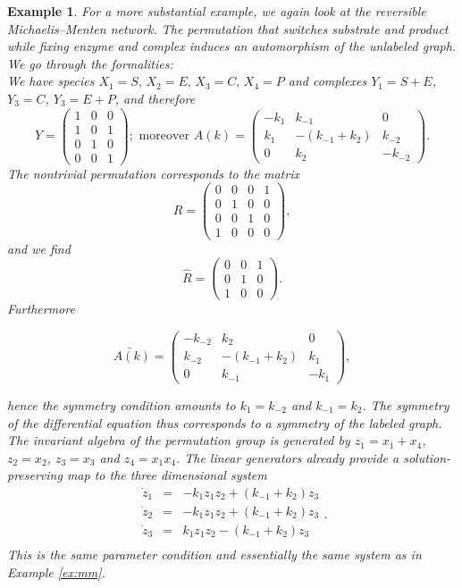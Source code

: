 \documentclass{article}
\newtheorem{example}{Example}
\begin{document}
\begin{example}{\em 
For a more substantial example, we again look at the reversible Michaelis--Menten network. The permutation that switches substrate and product while fixing enzyme and complex induces an automorphism of the unlabeled  graph. We go through the formalities:\\
We have species $X_1=S,\,X_2=E,\,X_3=C,\,X_4=P$ and complexes $Y_1=S+E$, $Y_3=C$, $Y_3=E+P$, and therefore
\[
Y=\begin{pmatrix} 1&0&0\\ 1&0&1\\0&1&0\\ 0&0&1\end{pmatrix};\text{  moreover  } A(k)=\begin{pmatrix} -k_1 &k_{-1}&0\\
k_1&-(k_{-1}+k_2) & k_{-2}\\ 0& k_{2}&-k_{-2}\end{pmatrix}.
\]
The nontrivial permutation corresponds to the matrix
\[
R=\begin{pmatrix} 0&0&0&1\\ 0&1&0&0\\ 0&0&1&0\\ 1&0&0&0\end{pmatrix},
\]
and we find 
\[
\widehat R=\begin{pmatrix} 0&0&1\\ 0&1&0\\1&0&0\end{pmatrix}.
\]
Furthermore

\[
\widetilde{A(k)}=\begin{pmatrix} -k_{-2} &k_{2}&0\\
k_{-2}&-(k_{-1}+k_2) & k_1\\ 0& k_{-1}&-k_{1}\end{pmatrix},
\]

hence the symmetry condition amounts to $k_1=k_{-2}$ and $k_{-1}=k_2$. The symmetry of the differential equation thus corresponds to a symmetry of the labeled graph.\\
The invariant algebra of the permutation group is generated by $z_1=x_1+x_4$, $z_2=x_2$, $z_3=x_3$ and $z_4=x_1x_4$. The linear generators already provide a solution-preserving map to the three dimensional system
\[
\begin{array}{rcl}
   \dot z_1  &=& -k_1z_1z_2+(k_{-1}+k_2)z_3  \\
      \dot z_2 &=& -k_1z_1z_2+(k_{-1}+k_2)z_3  \\
      \dot z_3 &=& k_1z_1z_2-(k_{-1}+k_2)z_3  \\
\end{array}.
\]
This is the same parameter condition and essentially the same system as in Example \ref{ex:mm}.
}
\end{example}
\end{document}

